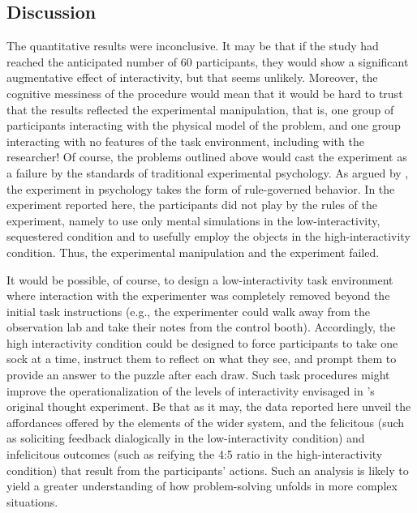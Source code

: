 \documentclass[twocolumn, issue, empirical, authordate,drafn]{jote-new-article}
\begin{document}
\subsection{Discussion}

The quantitative results were inconclusive. It may be that if the study had reached the anticipated number of 60 participants, they would show a significant augmentative effect of interactivity, but that seems unlikely. Moreover, the cognitive messiness of the procedure would mean that it would be hard to trust that the results reflected the experimental manipulation, that is, one group of participants interacting with the physical model of the problem, and one group interacting with no features of the task environment, including with the researcher! Of course, the problems outlined above would cast the experiment as a failure by the standards of traditional experimental psychology. As argued by \textcite{Gozli2017}, the experiment in psychology takes the form of rule-governed behavior. In the experiment reported here, the participants did not play by the rules of the experiment, namely to use only mental simulations in the low-interactivity, sequestered condition and to usefully employ the objects in the high-interactivity condition. Thus, the experimental manipulation and the experiment failed. 

It would be possible, of course, to design a low-interactivity task environment where interaction with the experimenter was completely removed beyond the initial task instructions (e.g., the experimenter could walk away from the observation lab and take their notes from the control booth). Accordingly, the high interactivity condition could be designed to force participants to take one sock at a time, instruct them to reflect on what they see, and prompt them to provide an answer to the puzzle after each draw. Such task procedures might improve the operationalization of the levels of interactivity envisaged in \textcite{Vallee-Tourangeau2020}'s original thought experiment. Be that as it may, the data reported here unveil the affordances offered by the elements of the wider system, and the felicitous (such as soliciting feedback dialogically in the low-interactivity condition) and infelicitous outcomes (such as reifying the 4:5 ratio in the high-interactivity condition) that result from the participants' actions. Such an analysis is likely to yield a greater understanding of how problem-solving unfolds in more complex situations. 
\end{document}
